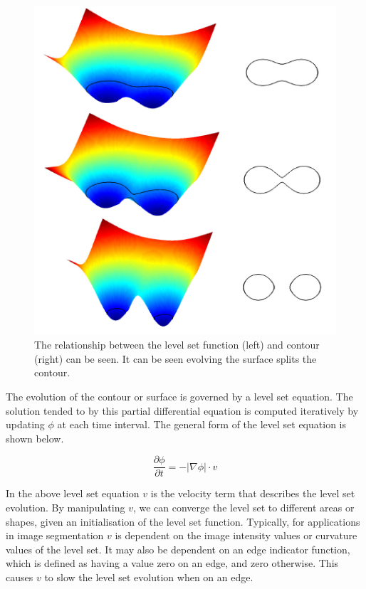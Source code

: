 \documentclass{report}
\begin{document}
\begin{figure}[h]
	\centering
		\includegraphics[scale=0.6]{images/levelsets.png}
	\caption{The relationship between the level set function (left) and contour (right) can be seen. It can be seen evolving the surface splits the contour.}
	\label{fig:levelsets}
\end{figure}

The evolution of the contour or surface is governed by a level set equation. The solution tended to by this partial differential equation is computed iteratively by updating $\phi$ at each time interval. The general form of the level set equation is shown below.

\begin{equation}
\frac{\partial{\phi}}{\partial{t}}=-|\nabla{\phi|}\cdot v
\end{equation}

In the above level set equation $v$ is the velocity term that describes the level set evolution. By manipulating $v$, we can converge the level set to different areas or shapes, given an initialisation of the level set function. Typically, for applications in image segmentation $v$ is dependent on the image intensity values or curvature values of the level set. It may also be dependent on an edge indicator function, which is defined as having a value zero on an edge, and zero otherwise. This causes $v$ to slow the level set evolution when on an edge.
\end{document}
